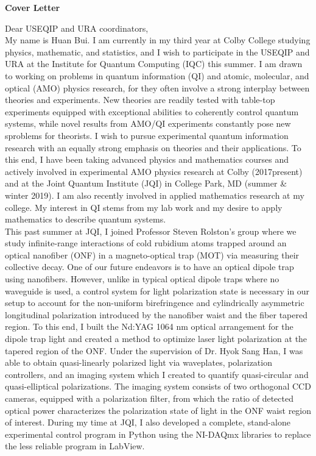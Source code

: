 \documentclass[12pt]{article}
\begin{document}
	

\begin{center}
	\textbf{Cover Letter}
\end{center}


\noindent Dear USEQIP and URA coordinators, \\



My name is Huan Bui. I am currently in my third year at Colby College studying physics, mathematic, and statistics, and I wish to participate in the USEQIP and URA at the Institute for Quantum Computing (IQC) this summer. I am drawn to working on problems in quantum information (QI) and atomic, molecular, and optical (AMO) physics research, for they often involve a strong interplay between theories and experiments. New theories are readily tested with table-top experiments equipped with exceptional abilities to coherently control quantum systems, while novel results from AMO/QI experiments constantly pose new sproblems for theorists. I wish to pursue experimental quantum information research with an equally strong emphasis on theories and their applications. To this end, I have been taking advanced physics and mathematics courses and actively involved in experimental AMO physics research at Colby (2017\textendash present) and at the Joint Quantum Institute (JQI) in College Park, MD (summer \& winter 2019). I am also recently involved in applied mathematics research at my college. My interest in QI stems from my lab work and my desire to apply mathematics to describe quantum systems. \\

This past summer at JQI, I joined Professor Steven Rolston's group where we study infinite-range interactions of cold rubidium atoms trapped around an optical nanofiber (ONF) in a magneto-optical trap (MOT) via measuring their collective decay. One of our future endeavors is to have an optical dipole trap using nanofibers. However, unlike in typical optical dipole traps where no waveguide is used, a control system for light polarization state is necessary in our setup to account for the non-uniform birefringence and cylindrically asymmetric longitudinal polarization introduced by the nanofiber waist and the fiber tapered region. To this end, I built the Nd:YAG 1064 nm optical arrangement for the dipole trap light and created a method to optimize laser light polarization at the tapered region of the ONF. Under the supervision of Dr. Hyok Sang Han, I was able to obtain quasi-linearly polarized light via waveplates, polarization controllers, and an imaging system which I created to quantify quasi-circular and quasi-elliptical polarizations. The imaging system consists of two orthogonal CCD cameras, equipped with a polarization filter, from which the ratio of detected optical power characterizes the polarization state of light in the ONF waist region of interest. During my time at JQI, I also developed a complete, stand-alone experimental control program in Python using the NI-DAQmx libraries to replace the less reliable program in LabView. \\ 
\end{document}
